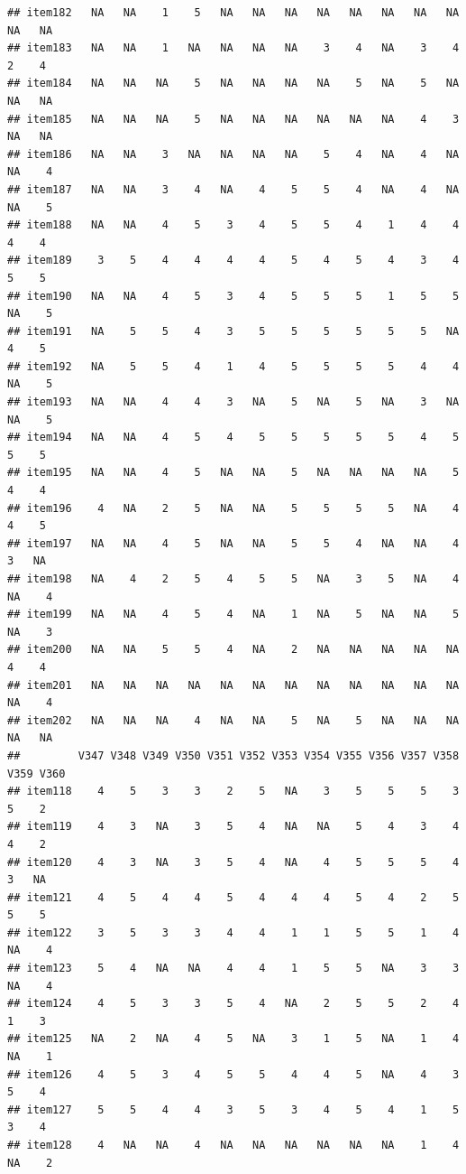 \documentclass[
  man]{apa6}
\begin{document}
\begin{verbatim}
## item182   NA   NA    1    5   NA   NA   NA   NA   NA   NA   NA   NA   NA   NA
## item183   NA   NA    1   NA   NA   NA   NA    3    4   NA    3    4    2    4
## item184   NA   NA   NA    5   NA   NA   NA   NA    5   NA    5   NA   NA   NA
## item185   NA   NA   NA    5   NA   NA   NA   NA   NA   NA    4    3   NA   NA
## item186   NA   NA    3   NA   NA   NA   NA    5    4   NA    4   NA   NA    4
## item187   NA   NA    3    4   NA    4    5    5    4   NA    4   NA   NA    5
## item188   NA   NA    4    5    3    4    5    5    4    1    4    4    4    4
## item189    3    5    4    4    4    4    5    4    5    4    3    4    5    5
## item190   NA   NA    4    5    3    4    5    5    5    1    5    5   NA    5
## item191   NA    5    5    4    3    5    5    5    5    5    5   NA    4    5
## item192   NA    5    5    4    1    4    5    5    5    5    4    4   NA    5
## item193   NA   NA    4    4    3   NA    5   NA    5   NA    3   NA   NA    5
## item194   NA   NA    4    5    4    5    5    5    5    5    4    5    5    5
## item195   NA   NA    4    5   NA   NA    5   NA   NA   NA   NA    5    4    4
## item196    4   NA    2    5   NA   NA    5    5    5    5   NA    4    4    5
## item197   NA   NA    4    5   NA   NA    5    5    4   NA   NA    4    3   NA
## item198   NA    4    2    5    4    5    5   NA    3    5   NA    4   NA    4
## item199   NA   NA    4    5    4   NA    1   NA    5   NA   NA    5   NA    3
## item200   NA   NA    5    5    4   NA    2   NA   NA   NA   NA   NA    4    4
## item201   NA   NA   NA   NA   NA   NA   NA   NA   NA   NA   NA   NA   NA    4
## item202   NA   NA   NA    4   NA   NA    5   NA    5   NA   NA   NA   NA   NA
##         V347 V348 V349 V350 V351 V352 V353 V354 V355 V356 V357 V358 V359 V360
## item118    4    5    3    3    2    5   NA    3    5    5    5    3    5    2
## item119    4    3   NA    3    5    4   NA   NA    5    4    3    4    4    2
## item120    4    3   NA    3    5    4   NA    4    5    5    5    4    3   NA
## item121    4    5    4    4    5    4    4    4    5    4    2    5    5    5
## item122    3    5    3    3    4    4    1    1    5    5    1    4   NA    4
## item123    5    4   NA   NA    4    4    1    5    5   NA    3    3   NA    4
## item124    4    5    3    3    5    4   NA    2    5    5    2    4    1    3
## item125   NA    2   NA    4    5   NA    3    1    5   NA    1    4   NA    1
## item126    4    5    3    4    5    5    4    4    5   NA    4    3    5    4
## item127    5    5    4    4    3    5    3    4    5    4    1    5    3    4
## item128    4   NA   NA    4   NA   NA   NA   NA   NA   NA    1    4   NA    2

\end{verbatim}
\end{document}
